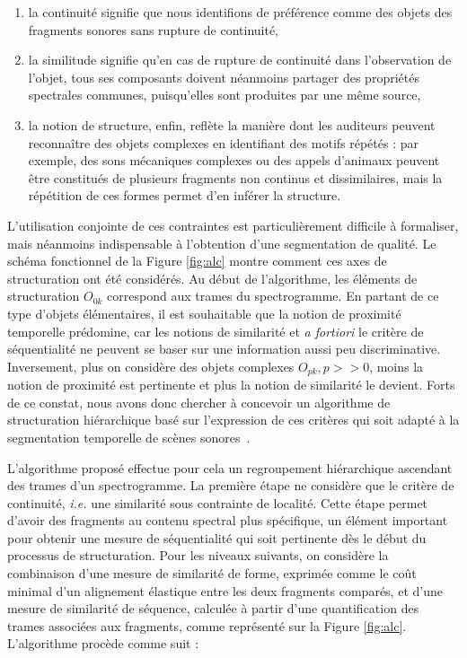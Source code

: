 \begin{enumerate}
  \item la continuité signifie que nous identifions de préférence comme des objets des fragments sonores sans rupture de continuité,
  \item la similitude signifie qu'en cas de rupture de continuité dans l'observation de l'objet, tous ses composants doivent néanmoins partager des propriétés spectrales communes, puisqu'elles sont produites par une même source,
  \item la notion de  structure, enfin, reflète la manière dont les auditeurs peuvent reconnaître des objets complexes en identifiant des motifs répétés : par exemple, des sons mécaniques complexes ou des appels d'animaux peuvent être constitués de plusieurs fragments non continus et dissimilaires, mais la répétition de ces formes permet d'en inférer la structure.
\end{enumerate}


L'utilisation conjointe de ces contraintes est particulièrement difficile à formaliser, mais néanmoins indispensable à l'obtention d'une segmentation de qualité. Le schéma fonctionnel de la Figure \ref{fig:alc} montre comment ces axes de structuration ont été considérés. Au début de l'algorithme, les éléments de structuration $O_{0 k}$ correspond aux trames du spectrogramme. En partant de ce type d'objets élémentaires, il est souhaitable que la notion de proximité temporelle prédomine, car les notions de similarité et \textit{a fortiori} le critère de séquentialité ne peuvent se baser sur une information aussi peu discriminative.  Inversement, plus on considère des objets complexes $O_{p k}, p >> 0$, moins la notion de proximité est pertinente et plus la notion de similarité le devient. Forts de ce constat, nous avons donc chercher à concevoir un algorithme de structuration hiérarchique basé sur l'expression de ces critères qui soit adapté à la segmentation temporelle de scènes sonores~\cite{rossignolhal-01122006}.

L'algorithme proposé effectue pour cela un regroupement hiérarchique ascendant des trames d'un spectrogramme. La première étape ne considère que le  critère de continuité, \textit{i.e.} une similarité sous contrainte de localité. Cette étape permet d'avoir des fragments au contenu spectral plus spécifique, un élément important pour obtenir une mesure de séquentialité qui soit pertinente dès le début du processus de structuration. Pour les niveaux suivants, on considère la combinaison d'une mesure de similarité de forme, exprimée comme le coût minimal d'un alignement élastique entre les deux fragments comparés, et d'une mesure de similarité de séquence, calculée à partir d'une quantification des trames associées aux fragments, comme représenté sur la Figure \ref{fig:alc}. L'algorithme procède comme suit :

